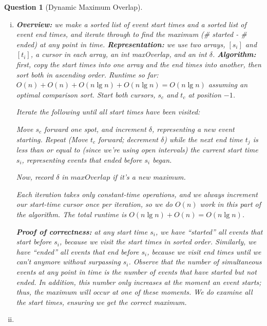 \documentclass{article}
\newtheorem{ques}{Question}
\renewcommand{\b}[1]{\textbf{#1}}
\begin{document}
\begin{ques}[Dynamic Maximum Overlap]
\begin{enumerate}[i.]
  \item %
  \b{Overview:} we make a sorted list of event start times and a sorted list of event end times, and iterate through to find the maximum (# started - # ended) at any point in time.
  \b{Representation:} we use two arrays, $[s_i]$ and $[t_i]$, a cursor in each array, an int maxOverlap, and an int $\delta$.
  \b{Algorithm:} first, copy the start times into one array and the end times into another, then sort both in ascending order. Runtime so far: $O(n) + O(n) + O(n\lg n) + O(n\lg n) = O(n\lg n)$ assuming an optimal comparison sort. Start both cursors, $s_c$ and $t_c$ at position $-1$.

  Iterate the following until all start times have been visited:

  Move $s_c$ forward one spot, and increment $\delta$, representing a new event starting. Repeat (Move $t_c$ forward; decrement $\delta$) while the next end time $t_j$ is less than or equal to (since we're using open intervals) the current start time $s_i$, representing events that ended before $s_i$ began.

  Now, record $\delta$ in $maxOverlap$ if it's a new maximum.

  Each iteration takes only constant-time operations, and we always increment our start-time cursor once per iteration, so we do $O(n)$ work in this part of the algorithm. The total runtime is $O(n\lg n) + O(n) = O(n\lg n)$.

  \b{Proof of correctness:} at any start time $s_i$, we have ``started'' all events that start before $s_i$, because we visit the start times in sorted order. Similarly, we have ``ended'' all events that end before $s_i$, because we visit end times until we can't anymore without surpassing $s_i$. Observe that the number of simultaneous events at any point in time is the number of events that have started but not ended. In addition, this number only increases at the moment an event starts; thus, the maximum will occur at one of these moments. We do examine all the start times, ensuring we get the correct maximum.

  \item 


\end{enumerate}
\end{ques}
\end{document}
